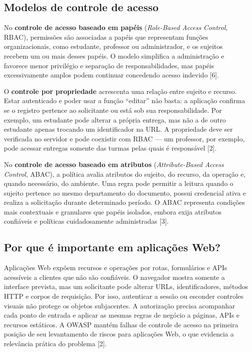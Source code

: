 \subsection{Modelos de controle de
acesso}\label{modelos-de-controle-de-acesso}

No \textbf{controle de acesso baseado em papéis} (\emph{Role-Based
Access Control}, RBAC), permissões são associadas a papéis que
representam funções organizacionais, como estudante, professor ou
administrador, e os sujeitos recebem um ou mais desses papéis. O modelo
simplifica a administração e favorece menor privilégio e separação de
responsabilidades, mas papéis excessivamente amplos podem continuar
concedendo acesso indevido {[}6{]}.

O \textbf{controle por propriedade} acrescenta uma relação entre sujeito
e recurso. Estar autenticado e poder usar a função ``editar'' não basta:
a aplicação confirma se o registro pertence ao solicitante ou está sob
sua responsabilidade. Por exemplo, um estudante pode alterar a própria
entrega, mas não a de outro estudante apenas trocando um identificador
na URL. A propriedade deve ser verificada no servidor e pode coexistir
com RBAC --- um professor, por exemplo, pode acessar entregas somente
das turmas pelas quais é responsável {[}2{]}.

No \textbf{controle de acesso baseado em atributos}
(\emph{Attribute-Based Access Control}, ABAC), a política avalia
atributos do sujeito, do recurso, da operação e, quando necessário, do
ambiente. Uma regra pode permitir a leitura quando o sujeito pertence ao
mesmo departamento do documento, possui credencial ativa e realiza a
solicitação durante determinado período. O ABAC representa condições
mais contextuais e granulares que papéis isolados, embora exija
atributos confiáveis e políticas cuidadosamente administradas {[}3{]}.

\subsection{Por que é importante em aplicações
Web?}\label{por-que-uxe9-importante-em-aplicauxe7uxf5es-web}

Aplicações Web expõem recursos e operações por rotas, formulários e APIs
acessíveis a clientes que não são confiáveis. O navegador mostra somente
a interface prevista, mas um solicitante pode alterar URLs,
identificadores, métodos HTTP e corpos de requisição. Por isso,
autenticar a sessão ou esconder controles visuais não protege os objetos
subjacentes. A autorização precisa acompanhar cada ponto de entrada e
aplicar as mesmas regras de negócio a páginas, APIs e recursos
estáticos. A OWASP mantém falhas de controle de acesso na primeira
posição de seu levantamento de riscos para aplicações Web, o que
evidencia a relevância prática do problema {[}2{]}.

